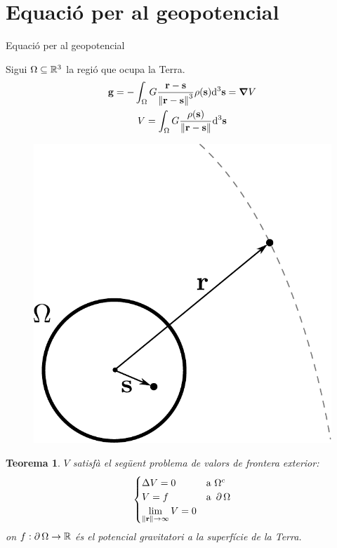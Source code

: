 \documentclass{beamer} %
\newtheorem{thm}[theorem]{Teorema}
\begin{document}
\section{Equació per al geopotencial}
\begin{frame}{Equació per al geopotencial}
  \begin{minipage}{0.68\textwidth}
    Sigui $\Omega\subseteq \mathbb{R}^3$ la regió que ocupa la Terra.
    \begin{gather*}
      \boldsymbol{\mathrm{g}} = -\int_\Omega G\frac{\boldsymbol{\mathrm{r}}-\boldsymbol{\mathrm{s}}}{\left\|\boldsymbol{\mathrm{r}}-\boldsymbol{\mathrm{s}}\right\|^3}\rho(\boldsymbol{\mathrm{s}})\dd^3\boldsymbol{\mathrm{s}}=\grad V\\
      V=\int_\Omega G\frac{\rho(\boldsymbol{\mathrm{s}})}{\left\|\boldsymbol{\mathrm{r}}-\boldsymbol{\mathrm{s}}\right\|}\dd^3\boldsymbol{\mathrm{s}}
    \end{gather*}
  \end{minipage}\hfill
  \begin{minipage}{0.31\textwidth}
    \begin{figure}
      \centering
      \includegraphics[width=\textwidth]{../Images/earth_pot.pdf}
    \end{figure}
  \end{minipage}
  \pause
  \begin{thm}
    $V$ satisfà el següent problema de valors de frontera exterior:
    \begin{equation*}\label{eq:dirichletProblem}
      \begin{cases}
        \Delta V = 0 & \text{a } \Omega^c    \\
        V = f            & \text{a } \operatorname{\partial}{\Omega} \\
        \displaystyle\lim_{\left\|\boldsymbol{\mathrm{r}}\right\|\to\infty}V=0
      \end{cases}
    \end{equation*}
    on $f:\operatorname{\partial}{\Omega}\to\mathbb{R}$ és el potencial gravitatori a la superfície de la Terra.
  \end{thm}
\end{frame}
\end{document}
